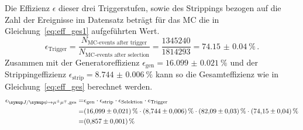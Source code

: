 %
Die Effizienz $\epsilon$ dieser drei Triggerstufen, sowie des Strippings bezogen auf die Zahl der Ereignisse im Datensatz beträgt für das MC die in Gleichung~\eqref{eq:eff_ges1} aufgeführten Wert.
%
\begin{equation}
  \epsilon_\text{Trigger}=\frac{N_\text{MC-events after trigger}}{N_\text{MC-events after selection}}=\frac{1345240}{1814293}=\SI{74.15(4)}{\percent} \, .
  \label{eq:eff_ges1}
\end{equation}
%
Zusammen mit der Generatoreffizienz $\epsilon_\text{gen}=\SI{16.099(21)}{\percent}$ und der Strippingeffizienz $\epsilon_\text{strip}=\SI{8.744(6)}{\percent}$ kann so die Gesamteffizienz wie in Gleichung~\eqref{eq:eff_ges} berechnet werden.
%
\begin{equation}
  \begin{split}
  \epsilon_{\kontroll, \text{ges}}=&\epsilon_\text{gen}\cdot\epsilon_\text{strip}\cdot\epsilon_\text{Selektion}\cdot\epsilon_\text{Trigger}\\
  =&\SI{16.099(21)}{\percent}\cdot\SI{8.744(6)}{\percent}\cdot\SI{82.09(3)}{\percent}\cdot\SI{74.15(4)}{\percent} \\
  =&\SI{0.857(1)}{\percent}
  \end{split}
  \label{eq:eff_ges}
\end{equation}
%
